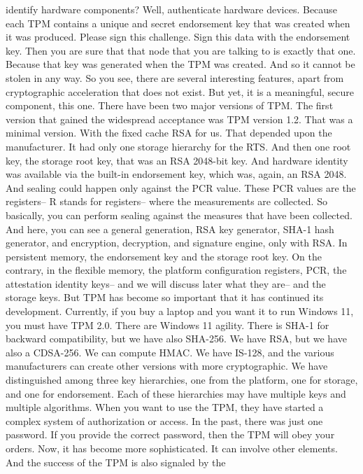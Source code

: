  identify hardware components? Well, authenticate hardware devices. Because
 each TPM contains a unique and secret endorsement key that was created when it
 was produced. Please sign this challenge. Sign this data with the endorsement
 key. Then you are sure that that node that you are talking to is exactly that
 one. Because that key was generated when the TPM was created. And so it cannot
 be stolen in any way. So you see, there are several interesting features,
 apart from cryptographic acceleration that does not exist. But yet, it is a
 meaningful, secure component, this one. There have been two major versions of
 TPM. The first version that gained the widespread acceptance was TPM version
 1.2. That was a minimal version. With the fixed cache RSA for us. That
 depended upon the manufacturer. It had only one storage hierarchy for the RTS.
 And then one root key, the storage root key, that was an RSA 2048-bit key. And
 hardware identity was available via the built-in endorsement key, which was,
 again, an RSA 2048. And sealing could happen only against the PCR value. These
 PCR values are the registers-- R stands for registers-- where the measurements
 are collected. So basically, you can perform sealing against the measures that
 have been collected. And here, you can see a general generation, RSA key
 generator, SHA-1 hash generator, and encryption, decryption, and signature
 engine, only with RSA. In persistent memory, the endorsement key and the
 storage root key. On the contrary, in the flexible memory, the platform
 configuration registers, PCR, the attestation identity keys-- and we will
 discuss later what they are-- and the storage keys. But TPM has become so
 important that it has continued its development. Currently, if you buy a
 laptop and you want it to run Windows 11, you must have TPM 2.0. There are
 Windows 11 agility. There is SHA-1 for backward compatibility, but we have
 also SHA-256. We have RSA, but we have also a CDSA-256. We can compute HMAC.
 We have IS-128, and the various manufacturers can create other versions with
 more cryptographic. We have distinguished among three key hierarchies, one
 from the platform, one for storage, and one for endorsement. Each of these
 hierarchies may have multiple keys and multiple algorithms. When you want to
 use the TPM, they have started a complex system of authorization or access. In
 the past, there was just one password. If you provide the correct password,
 then the TPM will obey your orders. Now, it has become more sophisticated. It
 can involve other elements. And the success of the TPM is also signaled by the

